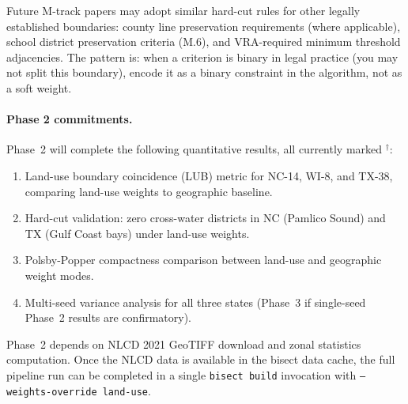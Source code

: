 Future M-track papers may adopt similar hard-cut rules for other legally
established boundaries: county line preservation requirements (where
applicable), school district preservation criteria (M.6), and
VRA-required minimum threshold adjacencies.
The pattern is: when a criterion is binary in legal practice
(you may not split this boundary), encode it as a binary constraint
in the algorithm, not as a soft weight.

\paragraph{Phase 2 commitments.}
Phase~2 will complete the following quantitative results, all currently
marked ${}^{\dagger}$:
\begin{enumerate}
  \item Land-use boundary coincidence (LUB) metric for NC-14, WI-8,
    and TX-38, comparing land-use weights to geographic baseline.
  \item Hard-cut validation: zero cross-water districts in NC (Pamlico Sound)
    and TX (Gulf Coast bays) under land-use weights.
  \item Polsby-Popper compactness comparison between land-use and geographic
    weight modes.
  \item Multi-seed variance analysis for all three states (Phase~3 if
    single-seed Phase~2 results are confirmatory).
\end{enumerate}

Phase~2 depends on NLCD 2021 GeoTIFF download and zonal statistics computation.
Once the NLCD data is available in the bisect data cache, the full pipeline
run can be completed in a single \texttt{bisect build} invocation with
\texttt{--weights-override land-use}.

